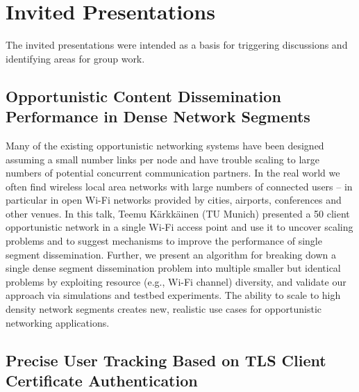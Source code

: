 \section{Invited Presentations}\label{sec:invited-presentations}

The invited presentations were intended as a basis for triggering discussions
and identifying areas for group work.

\subsection{Opportunistic Content Dissemination Performance in Dense Network Segments}

Many of the existing opportunistic networking systems have been designed
assuming a small number links per node and have trouble scaling to large
numbers of potential concurrent communication partners. In the real world we
often find wireless local area networks with large numbers of connected users
– in particular in open Wi-Fi networks provided by cities, airports,
conferences and other venues. In this talk, Teemu Kärkkäinen (TU Munich)
presented a 50 client opportunistic network in a single Wi-Fi access point and
use it to uncover scaling problems and to suggest mechanisms to improve the
performance of single segment dissemination. Further, we present an algorithm
for breaking down a single dense segment dissemination problem into multiple
smaller but identical problems by exploiting resource (e.g., Wi-Fi channel)
diversity, and validate our approach via simulations and testbed experiments.
The ability to scale to high density network segments creates new, realistic
use cases for opportunistic networking applications.

\subsection{Precise User Tracking Based on TLS Client Certificate Authentication} %

